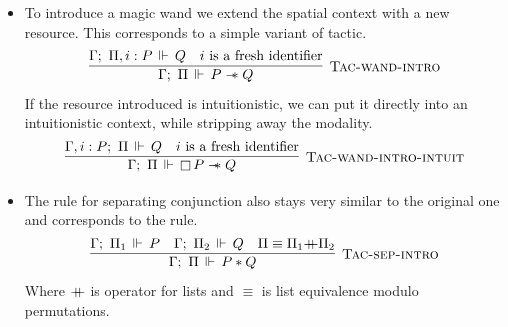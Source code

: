 \begin{itemize}
\item To introduce a magic wand we extend the spatial context with a new resource.
  This corresponds to a simple variant of  tactic.
  \[\infer[\textsc{Tac-wand-intro}]
      {\entailsD P \wand Q}
      {\entails {\IntuD} {\SpatD, i : P} {Q} &
       i \text{ is a fresh identifier}}
  \]
  If the resource introduced is intuitionistic, we can put it directly into an intuitionistic context, while stripping away the modality.
  \[\infer[\textsc{Tac-wand-intro-intuit}]
      {\entailsD \intuit P \wand Q}
      {\entails {\IntuD, i : P} {\SpatD} {Q} &
       i \text{ is a fresh identifier}}
  \]
\item The rule for separating conjunction also stays very similar to the original one and corresponds to the  rule.
  \[\infer[\textsc{Tac-sep-intro}]
      {\entailsD P * Q}
      {\entails {\IntuD} {\SpatD_1} P &
       \entails {\IntuD} {\SpatD_2} Q &
       \SpatD \equiv \SpatD_1 {+\hspace{-0.5em}+} \SpatD_2}
   \]
   Where \({+\hspace{-0.5em}+}\) is  operator for lists and \(\equiv\) is list equivalence modulo permutations.


\end{itemize}
